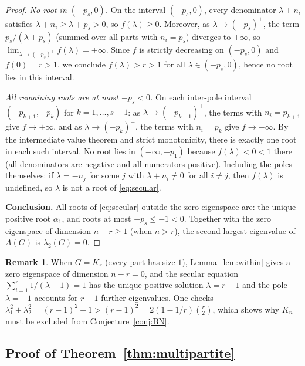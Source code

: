 \documentclass[preprint,12pt]{elsarticle}
\theoremstyle{plain}
\theoremstyle{definition}
\newtheorem{remark}[theorem]{Remark}
\begin{document}
\begin{proof}
\textit{No root in $(-p_s, 0)$.}
On the interval $(-p_s, 0)$, every denominator $\lambda + n_i$ satisfies
$\lambda + n_i \geq \lambda + p_s > 0$, so $f(\lambda) \geq 0$.
Moreover, as $\lambda \to (-p_s)^+$, the term $p_s/(\lambda + p_s)$
(summed over all parts with $n_i = p_s$) diverges to $+\infty$, so
$\lim_{\lambda \to (-p_s)^+} f(\lambda) = +\infty$.
Since $f$ is strictly decreasing on $(-p_s,0)$ and $f(0) = r > 1$,
we conclude $f(\lambda) > r > 1$ for all $\lambda \in (-p_s, 0)$,
hence no root lies in this interval.

\textit{All remaining roots are at most $-p_s < 0$.}
On each inter-pole interval $(-p_{k+1},-p_k)$ for $k = 1,\ldots,s-1$:
as $\lambda \to (-p_{k+1})^+$, the terms with $n_i = p_{k+1}$ give
$f \to +\infty$, and as $\lambda \to (-p_k)^-$, the terms with
$n_i = p_k$ give $f \to -\infty$.
By the intermediate value theorem and strict monotonicity, there is
exactly one root in each such interval.
No root lies in $(-\infty, -p_1)$ because $f(\lambda) < 0 < 1$ there
(all denominators are negative and all numerators positive).
Including the poles themselves: if $\lambda = -n_j$ for some $j$ with
$\lambda + n_i \neq 0$ for all $i \neq j$, then $f(\lambda)$ is undefined,
so $\lambda$ is not a root of \eqref{eq:secular}.

\textbf{Conclusion.}
All roots of \eqref{eq:secular} outside the zero eigenspace are:
the unique positive root $\alpha_1$, and roots at most $-p_s \leq -1 < 0$.
Together with the zero eigenspace of dimension $n - r \geq 1$
(when $n > r$), the second largest eigenvalue of $A(G)$ is
$\lambda_2(G) = 0$.
\end{proof}

\begin{remark}
  \label{rem:kr}
  When $G = K_r$ (every part has size $1$), Lemma~\ref{lem:within}
  gives a zero eigenspace of dimension $n - r = 0$, and the secular
  equation $\sum_{i=1}^r 1/(\lambda+1) = 1$ has the unique positive
  solution $\lambda = r-1$ and the pole $\lambda = -1$ accounts for
  $r-1$ further eigenvalues.
  One checks $\lambda_1^2 + \lambda_2^2 = (r-1)^2 + 1 > (r-1)^2
  = 2(1-1/r)\binom{r}{2}$, which shows why $K_n$ must be excluded
  from Conjecture~\ref{conj:BN}.
\end{remark}

\subsection{Proof of Theorem~\ref{thm:multipartite}}
\end{document}
